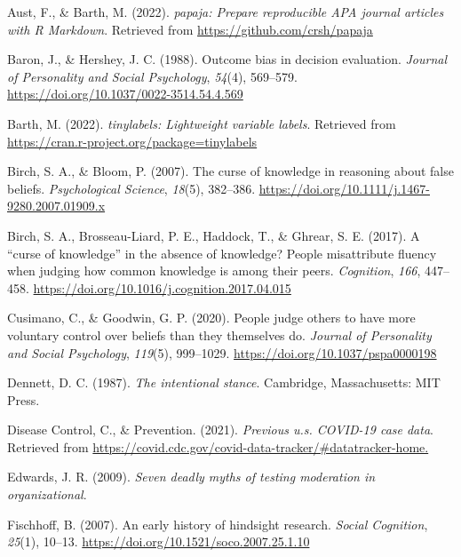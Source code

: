 \documentclass[
  man, donotrepeattitle,floatsintext]{apa6}
\newlength{\cslhangindent}
\newlength{\cslentryspacingunit} %
\newenvironment{CSLReferences}[2] %
 {%
  \setlength{\parindent}{0pt}
  \ifodd #1
  \let\oldpar\par
  \def\par{\hangindent=\cslhangindent\oldpar}
  \fi
  \setlength{\parskip}{#2\cslentryspacingunit}
 }%
 {}
\begin{document}
\hypertarget{refs}{}
\begin{CSLReferences}{1}{0}
\leavevmode{}%
Aust, F., \& Barth, M. (2022). \emph{{papaja}: {Prepare} reproducible {APA} journal articles with {R Markdown}}. Retrieved from \url{https://github.com/crsh/papaja}

\leavevmode{}%
Baron, J., \& Hershey, J. C. (1988). Outcome bias in decision evaluation. \emph{Journal of Personality and Social Psychology}, \emph{54}(4), 569--579. \url{https://doi.org/10.1037/0022-3514.54.4.569}

\leavevmode{}%
Barth, M. (2022). \emph{{tinylabels}: Lightweight variable labels}. Retrieved from \url{https://cran.r-project.org/package=tinylabels}

\leavevmode{}%
Birch, S. A., \& Bloom, P. (2007). The curse of knowledge in reasoning about false beliefs. \emph{Psychological Science}, \emph{18}(5), 382--386. \url{https://doi.org/10.1111/j.1467-9280.2007.01909.x}

\leavevmode{}%
Birch, S. A., Brosseau-Liard, P. E., Haddock, T., \& Ghrear, S. E. (2017). A {``curse of knowledge''} in the absence of knowledge? People misattribute fluency when judging how common knowledge is among their peers. \emph{Cognition}, \emph{166}, 447--458. \url{https://doi.org/10.1016/j.cognition.2017.04.015}

\leavevmode{}%
Cusimano, C., \& Goodwin, G. P. (2020). People judge others to have more voluntary control over beliefs than they themselves do. \emph{Journal of Personality and Social Psychology}, \emph{119}(5), 999--1029. \url{https://doi.org/10.1037/pspa0000198}

\leavevmode{}%
Dennett, D. C. (1987). \emph{The intentional stance}. Cambridge, Massachusetts: MIT Press.

\leavevmode{}%
Disease Control, C., \& Prevention. (2021). \emph{Previous u.s. COVID-19 case data}. Retrieved from \url{https://covid.cdc.gov/covid-data-tracker/\#datatracker-home.}

\leavevmode{}%
Edwards, J. R. (2009). \emph{Seven deadly myths of testing moderation in organizational}.

\leavevmode{}%
Fischhoff, B. (2007). An early history of hindsight research. \emph{Social Cognition}, \emph{25}(1), 10--13. \url{https://doi.org/10.1521/soco.2007.25.1.10}


\end{CSLReferences}
\end{document}
